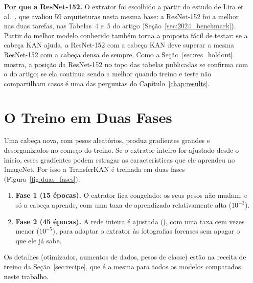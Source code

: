 \textbf{Por que a ResNet-152.} O extrator foi escolhido a partir do estudo de Lira et al.~\cite{Lira2025deep}, que avaliou 59 arquiteturas nesta mesma base: a ResNet-152 foi a melhor nas duas tarefas, nas Tabelas~4 e~5 do artigo (Seção~\ref{sec:2024_benchmark}). Partir do melhor modelo conhecido também torna a proposta fácil de testar: se a cabeça KAN ajuda, a ResNet-152 com a cabeça KAN deve superar a mesma ResNet-152 com a cabeça densa de sempre. Como a Seção~\ref{sec:res_holdout} mostra, a posição da ResNet-152 no topo das tabelas publicadas se confirma com o  do artigo; se ela continua sendo a melhor quando treino e teste não compartilham casos é uma das perguntas do Capítulo~\ref{chap:results}.

\section{O Treino em Duas Fases}
\label{sec:transferkan_treino}

Uma cabeça nova, com pesos aleatórios, produz gradientes grandes e desorganizados no começo do treino. Se o extrator inteiro for ajustado desde o início, esses gradientes podem estragar as características que ele aprendeu no ImageNet. Por isso a TransferKAN é treinada em duas fases (Figura~\ref{fig:duas_fases}):
\begin{enumerate}
    \item \textbf{Fase 1 (15 épocas).} O extrator fica congelado: os seus pesos não mudam, e só a cabeça aprende, com uma taxa de aprendizado relativamente alta ($10^{-3}$).
    \item \textbf{Fase 2 (45 épocas).} A rede inteira é ajustada (), com uma taxa cem vezes menor ($10^{-5}$), para adaptar o extrator às fotografias forenses sem apagar o que ele já sabe.
\end{enumerate}
Os detalhes (otimizador, aumentos de dados, pesos de classe) estão na receita de treino da Seção~\ref{sec:recipe}, que é a mesma para todos os modelos comparados neste trabalho.

